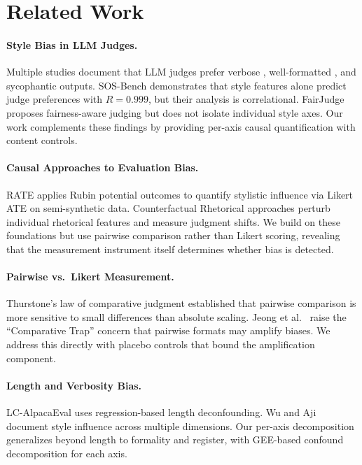 \documentclass[11pt]{article}
\begin{document}
\section{Related Work}

\paragraph{Style Bias in LLM Judges.}
Multiple studies document that LLM judges prefer verbose \cite{zheng2024chatbot,sun2024sosbench}, well-formatted \cite{stureborg2024large}, and sycophantic \cite{park2024disentangling} outputs.
SOS-Bench \cite{sun2024sosbench} demonstrates that style features alone predict judge preferences with $R = 0.999$, but their analysis is correlational.
FairJudge \cite{chen2024fairjudge} proposes fairness-aware judging but does not isolate individual style axes.
Our work complements these findings by providing per-axis causal quantification with content controls.

\paragraph{Causal Approaches to Evaluation Bias.}
RATE \cite{eisenstein2024rate} applies Rubin potential outcomes to quantify stylistic influence via Likert ATE on semi-synthetic data.
Counterfactual Rhetorical approaches \cite{salinas2024counterfactual} perturb individual rhetorical features and measure judgment shifts.
We build on these foundations but use pairwise comparison rather than Likert scoring, revealing that the measurement instrument itself determines whether bias is detected.

\paragraph{Pairwise vs.\ Likert Measurement.}
Thurstone's law of comparative judgment \cite{thurstone1927law} established that pairwise comparison is more sensitive to small differences than absolute scaling.
Jeong et al.\ \cite{jeong2025comparative} raise the ``Comparative Trap'' concern that pairwise formats may amplify biases.
We address this directly with placebo controls that bound the amplification component.

\paragraph{Length and Verbosity Bias.}
LC-AlpacaEval \cite{dubois2024length} uses regression-based length deconfounding.
Wu and Aji \cite{wu2024style} document style influence across multiple dimensions.
Our per-axis decomposition generalizes beyond length to formality and register, with GEE-based confound decomposition for each axis.
\end{document}
